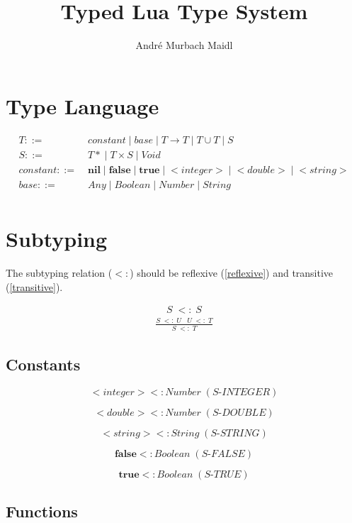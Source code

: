 \documentclass[12pt]{article}
\title{Typed Lua Type System}
\author{André Murbach Maidl}
\begin{document}
\maketitle

\section{Type Language}

\begin{align*}
T ::= \; & constant \; | \; base \; | \; T \rightarrow T \; | \; T \cup T \; 
 | \; S\\
S ::= \; & {T*} \; | \; T \times S \; | \; Void\\
constant ::= \; & \textbf{nil} \; | \; \textbf{false} \; | \; \textbf{true} \;
 | \; {<}integer{>} \; | \; {<}double{>} \; | \; {<}string{>}\\
base ::= \; & Any \; | \; Boolean \; | \; Number \; | \; String\\
\end{align*}

\section{Subtyping}

The subtyping relation ($<:$) should be reflexive (\ref{reflexive})
and transitive (\ref{transitive}).

\begin{align}
\label{reflexive}
S \; <: \; S
\end{align}
\begin{align}
\label{transitive}
\frac{S \; <: \; U \;\;\; U\;  <: \; T}{S \; <: \; T}
\end{align}

\subsection{Constants}

\[
{<}integer{>} <: Number \; (\textit{S-INTEGER})
\]

\[
{<}double{>} <: Number \; (\textit{S-DOUBLE})
\]

\[
{<}string{>} <: String \; (\textit{S-STRING})
\]

\[
\textbf{false} <: Boolean \; (\textit{S-FALSE})
\]

\[
\textbf{true} <: Boolean \; (\textit{S-TRUE})
\]

\subsection{Functions}
\end{document}
